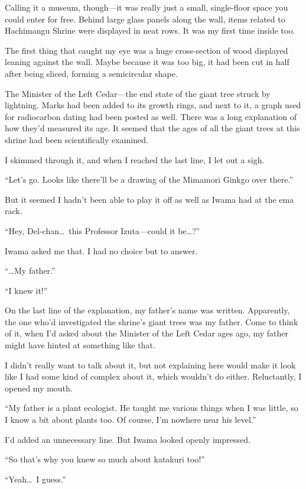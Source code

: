 \documentclass[
    a4paper,
    12pt,
    twoside,
    openany,
    UTF8,
    fontset=windows
]{ctexbook}
\begin{document}
Calling it a museum, though---it was really just a small, single-floor space you could enter for free. Behind large glass panels along the wall, items related to Hachimangu Shrine were displayed in neat rows. It was my first time inside too.

The first thing that caught my eye was a huge cross-section of wood displayed leaning against the wall. Maybe because it was too big, it had been cut in half after being sliced, forming a semicircular shape.

The Minister of the Left Cedar---the end state of the giant tree struck by lightning. Marks had been added to its growth rings, and next to it, a graph used for radiocarbon dating had been posted as well. There was a long explanation of how they'd measured its age. It seemed that the ages of all the giant trees at this shrine had been scientifically examined.

I skimmed through it, and when I reached the last line, I let out a sigh.

``Let's go. Looks like there'll be a drawing of the Mimamori Ginkgo over there.''

But it seemed I hadn't been able to play it off as well as Iwama had at the ema rack.

``Hey, Del-chan\dots\ this Professor Izuta---could it be\dots?''

Iwama asked me that. I had no choice but to answer.

``\dots My father.''

``I knew it!''

On the last line of the explanation, my father's name was written. Apparently, the one who'd investigated the shrine's giant trees was my father. Come to think of it, when I'd asked about the Minister of the Left Cedar ages ago, my father might have hinted at something like that.

I didn't really want to talk about it, but not explaining here would make it look like I had some kind of complex about it, which wouldn't do either. Reluctantly, I opened my mouth.

``My father is a plant ecologist. He taught me various things when I was little, so I know a bit about plants too. Of course, I'm nowhere near his level.''

I'd added an unnecessary line. But Iwama looked openly impressed.

``So that's why you knew so much about katakuri too!''

``Yeah\dots\ I guess.''
\end{document}
